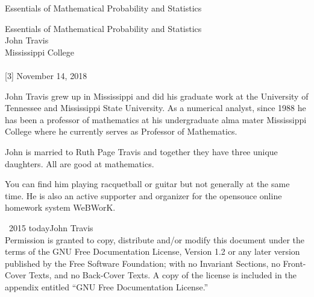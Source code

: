 \documentclass[10pt,]{book}
\numberwithin{equation}{section}
\begin{document}
\frontmatter
\thispagestyle{empty}
{\centering
\vspace*{0.28\textheight}
{\Huge Essentials of Mathematical Probability and Statistics}\\}
\clearpage
\thispagestyle{empty}
\null%
\clearpage
\thispagestyle{empty}
{\centering
\vspace*{0.14\textheight}
{\Huge Essentials of Mathematical Probability and Statistics}\\[3\baselineskip]
{\Large John Travis}\\[0.5\baselineskip]
{\Large Mississippi College}\\[3\baselineskip]
{\Large }\\[0.5\baselineskip]
[3\baselineskip]
{\Large November 14, 2018}\\}
\clearpage
\thispagestyle{empty}
\hypertarget{colophon-1}{}\noindent
\hypertarget{p-1}{}%
John Travis grew up in Mississippi and did his graduate work at the University of Tennessee and Mississippi State University. As a numerical analyst, since 1988 he has been a professor of mathematics at his undergraduate alma mater Mississippi College where he currently serves as Professor of Mathematics.%
\par
\hypertarget{p-2}{}%
John is married to Ruth Page Travis and together they have three unique daughters.  All are good at mathematics.%
\par
\hypertarget{p-3}{}%
You can find him playing racquetball or guitar but not generally at the same time. He is also an active supporter and organizer for the opensouce online homework system WeBWorK.%
\par
{}
\noindent\textcopyright\ 2015 \textendash{}today\quad{}John Travis\\[0.5\baselineskip]
Permission is granted to copy, distribute and/or modify this document under the terms of the GNU Free Documentation License, Version 1.2 or any later version published by the Free Software Foundation; with no Invariant Sections, no Front-Cover Texts, and no Back-Cover Texts.  A copy of the license is included in the appendix entitled ``GNU Free Documentation License.''\par\medskip
{}
\null\clearpage
\end{document}
